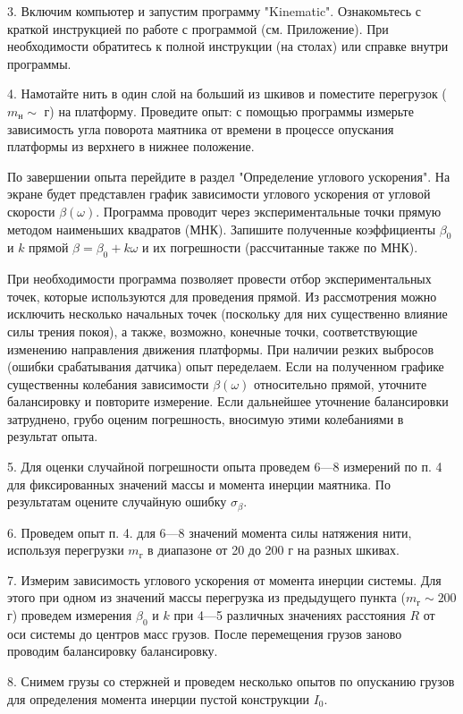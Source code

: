 \documentclass[14pt]{article}
\begin{document}
3. Включим компьютер и запустим программу "Kinematic". Ознакомьтесь с краткой инструкцией по работе с программой (см. Приложение). При необходимости обратитесь к полной инструкции (на столах) или справке внутри программы.

4. Намотайте нить в один слой на больший из шкивов и поместите перегрузок ($m_\text{н} \sim$ г) на платформу. Проведите опыт: с помощью программы измерьте зависимость угла поворота маятника от времени в процессе опускания платформы из верхнего в нижнее положение.

По завершении опыта перейдите в раздел "Определение углового ускорения". На экране будет представлен график зависимости углового ускорения от угловой скорости $\beta(\omega)$. Программа проводит через экспериментальные точки прямую методом наименьших квадратов (МНК). Запишите полученные коэффициенты $\beta_0$ и $k$ прямой $\beta = \beta_0 + k\omega$ и их погрешности (рассчитанные также по МНК).

При необходимости программа позволяет провести отбор экспериментальных точек, которые используются для проведения прямой. Из рассмотрения можно исключить несколько начальных точек (поскольку для них существенно влияние силы трения покоя), а также, возможно, конечные точки, соответствующие изменению направления движения платформы. При наличии резких выбросов (ошибки срабатывания датчика) опыт переделаем. Если на полученном графике существенны колебания зависимости $\beta(\omega)$ относительно прямой, уточните балансировку и повторите измерение. Если дальнейшее уточнение балансировки затруднено, грубо оценим погрешность, вносимую этими колебаниями в результат опыта. 

5. Для оценки случайной погрешности опыта проведем 6---8 измерений по п. 4 для фиксированных значений массы и момента инерции маятника. По результатам оцените случайную ошибку $\sigma_{\beta}$.

6. Проведем опыт п. 4. для 6---8 значений момента силы натяжения нити, используя перегрузки $m_\text{г}$ в диапазоне от 20 до 200 г на разных
шкивах.

7. Измерим зависимость углового ускорения от момента инерции системы. Для этого при одном из значений массы перегрузка из предыдущего пункта ($m_\text{г} \sim 200$г) проведем измерения $\beta_0$ и $k$ при 4---5 различных значениях расстояния $R$ от оси системы до центров масс грузов. После перемещения грузов заново проводим балансировку балансировку.

8. Снимем грузы со стержней и проведем несколько опытов по опусканию грузов для определения момента инерции пустой конструкции $I_0$.
\end{document}
